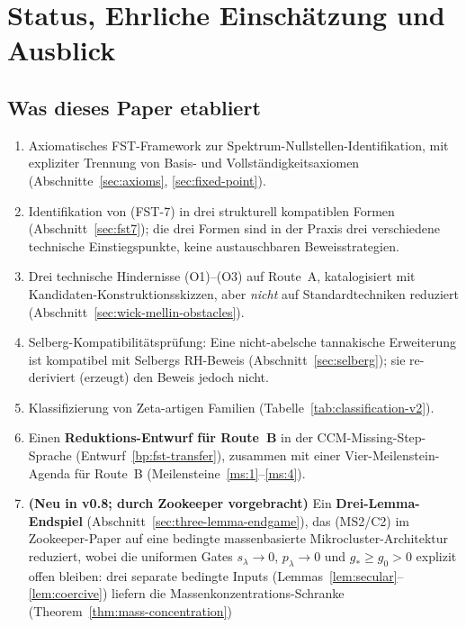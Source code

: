 \documentclass[11pt,a4paper]{article}
\theoremstyle{plain}
\theoremstyle{definition}
\begin{document}
\section{Status, Ehrliche Einschätzung und Ausblick}
\label{sec:status}

\subsection{Was dieses Paper etabliert}

\begin{enumerate}[leftmargin=*]
\item Axiomatisches FST-Framework zur Spektrum-Nullstellen-Identifikation,
  mit expliziter Trennung von Basis- und Vollständigkeitsaxiomen
  (Abschnitte~\ref{sec:axioms}, \ref{sec:fixed-point}).
\item Identifikation von (FST-7) in drei strukturell kompatiblen
  Formen (Abschnitt~\ref{sec:fst7}); die drei Formen sind in der Praxis
  drei verschiedene technische Einstiegspunkte, keine austauschbaren
  Beweisstrategien.
\item Drei technische Hindernisse (O1)--(O3) auf Route~A, katalogisiert
  mit Kandidaten-Konstruktionsskizzen, aber \emph{nicht} auf Standardtechniken
  reduziert (Abschnitt~\ref{sec:wick-mellin-obstacles}).
\item Selberg-Kompatibilitätsprüfung: Eine nicht-abelsche tannakische Erweiterung
  ist kompatibel mit Selbergs RH-Beweis
  (Abschnitt~\ref{sec:selberg}); sie re-deriviert (erzeugt) den Beweis jedoch nicht.
\item Klassifizierung von Zeta-artigen Familien
  (Tabelle~\ref{tab:classification-v2}).
\item Einen \textbf{Reduktions-Entwurf für Route~B} in der CCM-Missing-Step-Sprache
  (Entwurf~\ref{bp:fst-transfer}), zusammen mit einer
  Vier-Meilenstein-Agenda für Route~B (Meilensteine~\ref{ms:1}--\ref{ms:4}).
\item \textbf{(Neu in v0.8; durch Zookeeper vorgebracht)} Ein \textbf{Drei-Lemma-Endspiel}
  (Abschnitt~\ref{sec:three-lemma-endgame}), das (MS2/C2) im Zookeeper-Paper
  auf eine bedingte massenbasierte Mikrocluster-Architektur reduziert, wobei
  die uniformen Gates $s_\lambda\to0$, $p_\lambda\to0$ und $g_*\ge g_0>0$
  explizit offen bleiben: drei separate bedingte Inputs
  (Lemmas~\ref{lem:secular}--\ref{lem:coercive}) liefern die
  Massenkonzentrations-Schranke (Theorem~\ref{thm:mass-concentration})

\end{enumerate}
\end{document}

